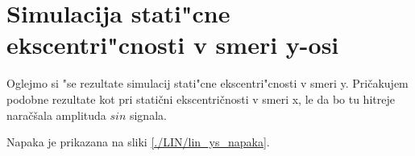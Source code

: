 %
%
%


\section{Simulacija stati"cne ekscentri"cnosti v smeri y-osi}

Oglejmo si "se rezultate simulacij stati"cne ekscentri"cnosti v smeri y. Pričakujem podobne rezultate kot pri statični ekscentričnosti v smeri x, le da bo tu hitreje naračšala amplituda $sin$ signala.
 

Napaka je prikazana na sliki \ref{./LIN/lin_ys_napaka}.


